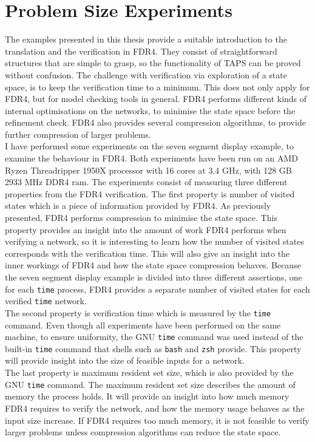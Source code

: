 \section{Problem Size Experiments}
The examples presented in this thesis provide a suitable introduction to the translation and the verification in FDR4. They consist of straightforward structures that are simple to grasp, so the functionality of TAPS can be proved without confusion.
The challenge with verification via exploration of a state space, is to keep the verification time to a minimum. This does not only apply for FDR4, but for model checking tools in general. FDR4 performs different kinds of internal optimisations on the networks, to minimise the state space before the refinement check. FDR4 also provides several compression algorithms, to provide further compression of larger problems. \\

I have performed some experiments on the seven segment display example, to examine the behaviour in FDR4.
Both experiments have been run on an
AMD Ryzen Threadripper 1950X processor with 16 cores at 3.4 GHz, with 128 GB 2933 MHz DDR4 ram.
The experiments consist of measuring three different properties from the FDR4 verification.
The first property is number of visited states which is a piece of information provided by FDR4.
As previously presented, FDR4 performs compression to minimise the state space.
This property provides an insight into the amount of work FDR4 performs when verifying a network, so it is interesting to learn how the number of visited states corresponds with the verification time. This will also give an insight into the inner workings of FDR4 and how the state space compression behaves.
Because the seven segment display example is divided into three different assertions, one for each \texttt{time} process, FDR4 provides a separate number of visited states for each verified \texttt{time} network. \\

The second property is verification time which is measured by the \texttt{time} command. Even though all experiments have been performed on the same machine, to ensure uniformity, the GNU \texttt{time} command was used instead of the built-in \texttt{time} command that shells such as \texttt{bash} and \texttt{zsh} provide. This property will provide insight into the size of feasible inputs for a \cspm{} network.\\

The last property is maximum resident set size, which is also provided by the GNU \texttt{time} command. The maximum resident set size describes the amount of memory the process holds. It will provide an insight into how much memory FDR4 requires to verify the network, and how the memory usage behaves as the input size increase. If FDR4 requires too much memory, it is not feasible to verify larger problems unless compression algorithms can reduce the state space. \\

